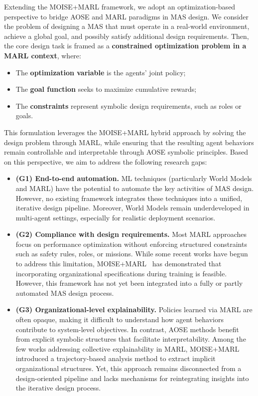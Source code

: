 \documentclass[pdflatex,sn-mathphys-num]{sn-jnl}%
\theoremstyle{thmstyleone}%
\theoremstyle{thmstyletwo}%
\theoremstyle{thmstylethree}%
\begin{document}
Extending the MOISE+MARL framework, we adopt an optimization-based perspective to bridge AOSE and MARL paradigms in MAS design. We consider the problem of designing a MAS that must operate in a real-world environment, achieve a global goal, and possibly satisfy additional design requirements. Then, the core design task is framed as a \textbf{constrained optimization problem in a MARL context}, where:
\begin{itemize}
    \item The \textbf{optimization variable} is the agents' joint policy;
    \item The \textbf{goal function} seeks to maximize cumulative rewards;
    \item The \textbf{constraints} represent symbolic design requirements, such as roles or goals.
\end{itemize}

\noindent This formulation leverages the MOISE+MARL hybrid approach by solving the design problem through MARL, while ensuring that the resulting agent behaviors remain controllable and interpretable through AOSE symbolic principles. Based on this perspective, we aim to address the following research gaps:
%
\begin{itemize}
    \item \textbf{(G1) End-to-end automation.} ML techniques (particularly World Models and MARL) have the potential to automate the key activities of MAS design. However, no existing framework integrates these techniques into a unified, iterative design pipeline. Moreover, World Models remain underdeveloped in multi-agent settings, especially for realistic deployment scenarios.
          
    \item \textbf{(G2) Compliance with design requirements.} Most MARL approaches focus on performance optimization without enforcing structured constraints such as safety rules, roles, or missions. While some recent works have begun to address this limitation, MOISE+MARL~\cite{soule2025moisemarl} has demonstrated that incorporating organizational specifications during training is feasible. However, this framework has not yet been integrated into a fully or partly automated MAS design process.
          
    \item \textbf{(G3) Organizational-level explainability.} Policies learned via MARL are often opaque, making it difficult to understand how agent behaviors contribute to system-level objectives. In contrast, AOSE methods benefit from explicit symbolic structures that facilitate interpretability. Among the few works addressing collective explainability in MARL, MOISE+MARL~\cite{soule2025moisemarl} introduced a trajectory-based analysis method to extract implicit organizational structures. Yet, this approach remains disconnected from a design-oriented pipeline and lacks mechanisms for reintegrating insights into the iterative design process.
\end{itemize}
\end{document}
